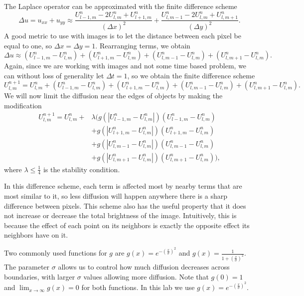 The Laplace operator can be approximated with the finite difference scheme
\[\Delta u = u_{xx}+u_{yy} \approx \frac{U_{l-1,m}^n - 2 U_{l,m}^n + U_{l+1,m}^n}{(\Delta x)^2} + \frac{U_{l,m-1}^n-2 U_{l,m}^n + U_{l,m+1}^n}{(\Delta y)^2}.\]
A good metric to use with images is to let the distance between each pixel be equal to one, so $\Delta x = \Delta y = 1$.
Rearranging terms, we obtain
\[\Delta u \approx (U_{l-1,m}^n - U_{l,m}^n) + (U_{l+1,m}^n - U_{l,m}^n) + (U_{l,m-1}^n - U_{l,m}^n) + (U_{l,m+1}^n - U_{l,m}^n).\]
Again, since we are working with images and not some time based problem, we can without loss of generality let $\Delta t = 1$, so we obtain the finite difference scheme
\[U_{l,m}^{n+1} = U_{l,m}^n + (U_{l-1,m}^n - U_{l,m}^n) + (U_{l+1,m}^n - U_{l,m}^n) + (U_{l,m-1}^n - U_{l,m}^n) + (U_{l,m+1}^n - U_{l,m}^n).\]
We will now limit the diffusion near the edges of objects by making the modification
\begin{equation}\label{eq:anisotropic}
\begin{aligned}
U_{l,m}^{n+1} = U_{l,m}^n + & \lambda \Big(g(|U_{l-1,m}^n - U_{l,m}^n|)(U_{l-1,m}^n - U_{l,m}^n) \\
			&+ g(|U_{l+1,m}^n - U_{l,m}^n|)(U_{l+1,m}^n - U_{l,m}^n) \\
			&+ g(|U_{l,m-1}^n - U_{l,m}^n|)(U_{l,m-1}^n - U_{l,m}^n) \\
			&+ g(|U_{l,m+1}^n - U_{l,m}^n|)(U_{l,m+1}^n - U_{l,m}^n)\Big),
\end{aligned}
\end{equation}
where $\lambda \leq \frac{1}{4}$ is the stability condition.

In this difference scheme, each term is affected most by nearby terms that are most similar to it, so less diffusion will happen anywhere there is a sharp difference between pixels.
This scheme also has the useful property that it does not increase or decrease the total brightness of the image.
Intuitively, this is because the effect of each point on its neighbors is exactly the opposite effect its neighbors have on it.

Two commonly used functions for $g$ are $g(x) = e^{-\left(\frac{x}{\sigma}\right)^2}$ and $g(x) = \frac{1}{1+\left(\frac{x}{\sigma}\right)^2}$.
The parameter $\sigma$ allows us to control how much diffusion decreases across boundaries, with larger $\sigma$ values allowing more diffusion.
Note that $g(0) = 1$ and $\displaystyle{\lim_{x\to \infty} g(x) = 0}$ for both functions.
In this lab we use $g(x)=e^{-\left(\frac{x}{\sigma}\right)^2}$.


